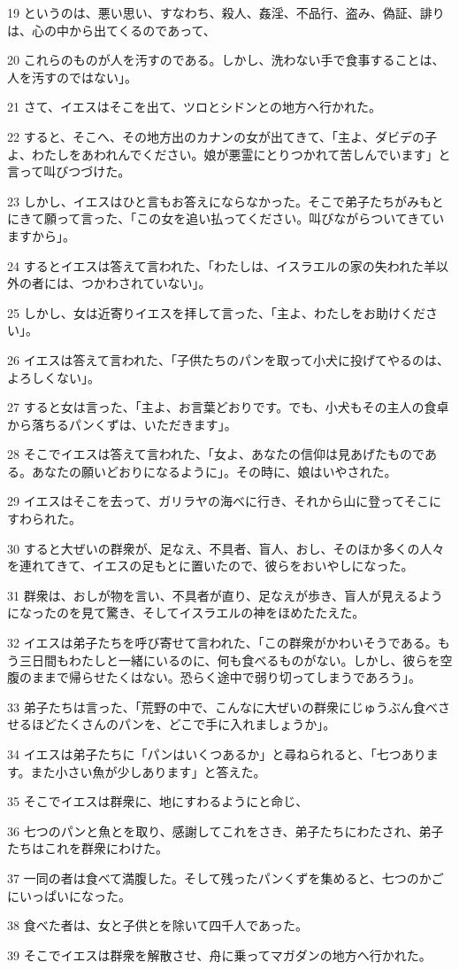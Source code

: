 \par 19 というのは、悪い思い、すなわち、殺人、姦淫、不品行、盗み、偽証、誹りは、心の中から出てくるのであって、
\par 20 これらのものが人を汚すのである。しかし、洗わない手で食事することは、人を汚すのではない」。
\par 21 さて、イエスはそこを出て、ツロとシドンとの地方へ行かれた。
\par 22 すると、そこへ、その地方出のカナンの女が出てきて、「主よ、ダビデの子よ、わたしをあわれんでください。娘が悪霊にとりつかれて苦しんでいます」と言って叫びつづけた。
\par 23 しかし、イエスはひと言もお答えにならなかった。そこで弟子たちがみもとにきて願って言った、「この女を追い払ってください。叫びながらついてきていますから」。
\par 24 するとイエスは答えて言われた、「わたしは、イスラエルの家の失われた羊以外の者には、つかわされていない」。
\par 25 しかし、女は近寄りイエスを拝して言った、「主よ、わたしをお助けください」。
\par 26 イエスは答えて言われた、「子供たちのパンを取って小犬に投げてやるのは、よろしくない」。
\par 27 すると女は言った、「主よ、お言葉どおりです。でも、小犬もその主人の食卓から落ちるパンくずは、いただきます」。
\par 28 そこでイエスは答えて言われた、「女よ、あなたの信仰は見あげたものである。あなたの願いどおりになるように」。その時に、娘はいやされた。
\par 29 イエスはそこを去って、ガリラヤの海べに行き、それから山に登ってそこにすわられた。
\par 30 すると大ぜいの群衆が、足なえ、不具者、盲人、おし、そのほか多くの人々を連れてきて、イエスの足もとに置いたので、彼らをおいやしになった。
\par 31 群衆は、おしが物を言い、不具者が直り、足なえが歩き、盲人が見えるようになったのを見て驚き、そしてイスラエルの神をほめたたえた。
\par 32 イエスは弟子たちを呼び寄せて言われた、「この群衆がかわいそうである。もう三日間もわたしと一緒にいるのに、何も食べるものがない。しかし、彼らを空腹のままで帰らせたくはない。恐らく途中で弱り切ってしまうであろう」。
\par 33 弟子たちは言った、「荒野の中で、こんなに大ぜいの群衆にじゅうぶん食べさせるほどたくさんのパンを、どこで手に入れましょうか」。
\par 34 イエスは弟子たちに「パンはいくつあるか」と尋ねられると、「七つあります。また小さい魚が少しあります」と答えた。
\par 35 そこでイエスは群衆に、地にすわるようにと命じ、
\par 36 七つのパンと魚とを取り、感謝してこれをさき、弟子たちにわたされ、弟子たちはこれを群衆にわけた。
\par 37 一同の者は食べて満腹した。そして残ったパンくずを集めると、七つのかごにいっぱいになった。
\par 38 食べた者は、女と子供とを除いて四千人であった。
\par 39 そこでイエスは群衆を解散させ、舟に乗ってマガダンの地方へ行かれた。

